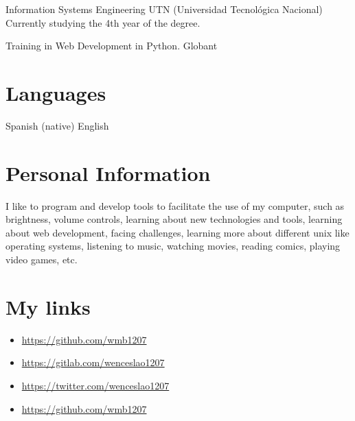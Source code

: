 \documentclass[11pt]{article}
\begin{document}
Information Systems Engineering UTN (Universidad Tecnológica Nacional)
Currently studying the 4th year of the degree.

Training in Web Development in Python. Globant

\section{Languages}
\label{sec:org7ecde96}

Spanish  (native)
English 

\section{Personal Information}
\label{sec:orgec75044}

I like to program and develop tools to facilitate the use of my computer, such as brightness, volume controls, learning about new technologies and tools, learning about web development, facing challenges, learning more about different unix like operating systems, listening to music, watching movies, reading comics, playing video games, etc.

\section{My links}
\label{sec:org44eedb0}

\begin{itemize}
\item \url{https://github.com/wmb1207}
\item \url{https://gitlab.com/wenceslao1207}
\item \url{https://twitter.com/wenceslao1207}
\item \url{https://github.com/wmb1207}
\end{itemize}
\end{document}
